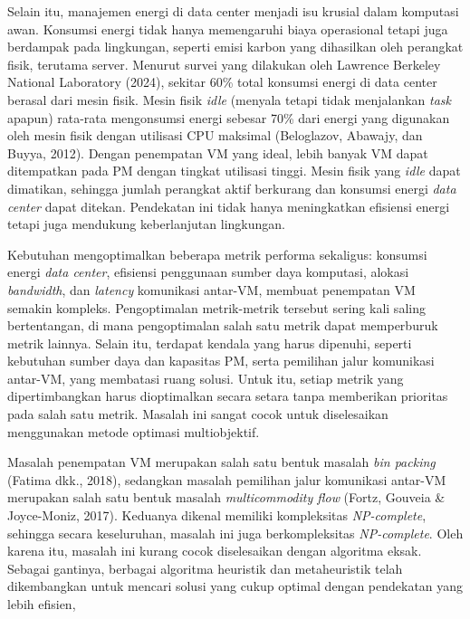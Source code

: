Selain itu, manajemen energi di data center menjadi isu krusial dalam komputasi awan. Konsumsi energi tidak hanya memengaruhi biaya operasional tetapi juga berdampak pada lingkungan, seperti emisi karbon yang dihasilkan oleh perangkat fisik, terutama server. Menurut survei yang dilakukan oleh Lawrence Berkeley National Laboratory (2024), sekitar 60\% total konsumsi energi di data center berasal dari mesin fisik. Mesin fisik \textit{idle} (menyala tetapi tidak menjalankan \textit{task} apapun) rata-rata mengonsumsi energi sebesar 70\% dari energi yang digunakan oleh mesin fisik dengan utilisasi CPU maksimal (Beloglazov, Abawajy, dan Buyya, 2012). Dengan penempatan VM yang ideal, lebih banyak VM dapat ditempatkan pada PM dengan tingkat utilisasi tinggi. Mesin fisik yang \textit{idle} dapat dimatikan, sehingga jumlah perangkat aktif berkurang dan konsumsi energi \textit{data center} dapat ditekan. Pendekatan ini tidak hanya meningkatkan efisiensi energi tetapi juga mendukung keberlanjutan lingkungan.

Kebutuhan mengoptimalkan beberapa metrik performa sekaligus: konsumsi energi \textit{data center}, efisiensi penggunaan sumber daya komputasi, alokasi \textit{bandwidth}, dan \textit{latency} komunikasi antar-VM, membuat penempatan VM semakin kompleks. Pengoptimalan metrik-metrik tersebut sering kali saling bertentangan, di mana pengoptimalan salah satu metrik dapat memperburuk metrik lainnya. Selain itu, terdapat kendala yang harus dipenuhi, seperti kebutuhan sumber daya dan kapasitas PM, serta pemilihan jalur komunikasi antar-VM, yang membatasi ruang solusi. Untuk itu, setiap metrik yang dipertimbangkan harus dioptimalkan secara setara tanpa memberikan prioritas pada salah satu metrik. Masalah ini sangat cocok untuk diselesaikan menggunakan metode optimasi multiobjektif.

Masalah penempatan VM merupakan salah satu bentuk masalah \textit{bin packing} (Fatima dkk., 2018), sedangkan masalah pemilihan jalur komunikasi antar-VM merupakan salah satu bentuk masalah \textit{multicommodity flow} (Fortz, Gouveia & Joyce-Moniz, 2017). Keduanya dikenal memiliki kompleksitas \textit{NP-complete}, sehingga secara keseluruhan, masalah ini juga berkompleksitas \textit{NP-complete}. Oleh karena itu, masalah ini kurang cocok diselesaikan dengan algoritma eksak. Sebagai gantinya, berbagai algoritma heuristik dan metaheuristik telah dikembangkan untuk mencari solusi yang cukup optimal dengan pendekatan yang lebih efisien,


